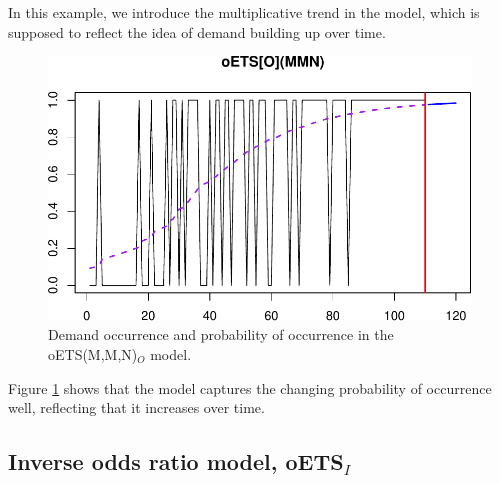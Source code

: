 \documentclass[
]{book}
\theoremstyle{definition}
\theoremstyle{definition}
\theoremstyle{definition}
\theoremstyle{definition}
\theoremstyle{remark}
\begin{document}
In this example, we introduce the multiplicative trend in the model, which is supposed to reflect the idea of demand building up over time.

\begin{figure}
\centering
\includegraphics{Svetunkov--2022----ADAM_files/figure-latex/oETSOModel-1.pdf}
\caption{\label{fig:oETSOModel}Demand occurrence and probability of occurrence in the oETS(M,M,N)\(_O\) model.}
\end{figure}

Figure \ref{fig:oETSOModel} shows that the model captures the changing probability of occurrence well, reflecting that it increases over time.

\hypertarget{oETSI}{%
\subsection{\texorpdfstring{Inverse odds ratio model, oETS\(_I\)}{Inverse odds ratio model, oETS\_I}}\label{oETSI}}
\end{document}
